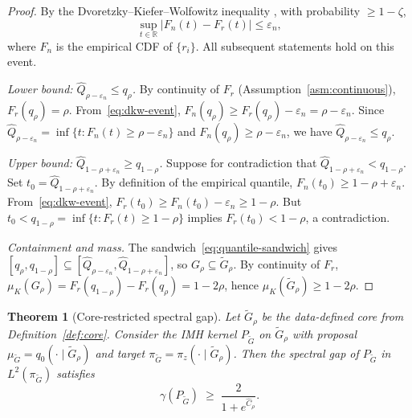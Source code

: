 \documentclass[12pt]{article}
\newtheorem{theorem}{Theorem}
\newcommand{\R}{\mathbb{R}}
\begin{document}
\begin{proof}
By the Dvoretzky--Kiefer--Wolfowitz inequality \citep{DKW1956,Massart1990}, with probability $\ge 1 - \zeta$,
\begin{equation}\label{eq:dkw-event}
  \sup_{t \in \R} |F_n(t) - F_r(t)| \le \varepsilon_n,
\end{equation}
where $F_n$ is the empirical CDF of $\{r_i\}$. All subsequent statements hold on this event.

\emph{Lower bound: $\hat{Q}_{\rho-\varepsilon_n} \le q_\rho$.}\;
By continuity of $F_r$ (Assumption~\ref{asm:continuous}), $F_r(q_\rho) = \rho$.
From~\eqref{eq:dkw-event}, $F_n(q_\rho) \ge F_r(q_\rho) - \varepsilon_n = \rho - \varepsilon_n$.
Since $\hat{Q}_{\rho-\varepsilon_n} = \inf\{t: F_n(t) \ge \rho - \varepsilon_n\}$ and $F_n(q_\rho) \ge \rho - \varepsilon_n$,
we have $\hat{Q}_{\rho-\varepsilon_n} \le q_\rho$.

\emph{Upper bound: $\hat{Q}_{1-\rho+\varepsilon_n} \ge q_{1-\rho}$.}\;
Suppose for contradiction that $\hat{Q}_{1-\rho+\varepsilon_n} < q_{1-\rho}$.
Set $t_0 = \hat{Q}_{1-\rho+\varepsilon_n}$.
By definition of the empirical quantile, $F_n(t_0) \ge 1-\rho+\varepsilon_n$.
From~\eqref{eq:dkw-event}, $F_r(t_0) \ge F_n(t_0) - \varepsilon_n \ge 1-\rho$.
But $t_0 < q_{1-\rho} = \inf\{t: F_r(t) \ge 1-\rho\}$ implies $F_r(t_0) < 1-\rho$, a contradiction.

\emph{Containment and mass.}\;
The sandwich~\eqref{eq:quantile-sandwich} gives $[q_\rho, q_{1-\rho}] \subseteq [\hat{Q}_{\rho-\varepsilon_n}, \hat{Q}_{1-\rho+\varepsilon_n}]$,
so $G_\rho \subseteq \tilde{G}_\rho$.
By continuity of $F_r$, $\mu_K(G_\rho) = F_r(q_{1-\rho}) - F_r(q_\rho) = 1 - 2\rho$, hence $\mu_K(\tilde{G}_\rho) \ge 1-2\rho$.
\end{proof}


\begin{theorem}[Core-restricted spectral gap]\label{thm:core-gap}
Let $\tilde{G}_\rho$ be the data-defined core from Definition~\ref{def:core}.
Consider the IMH kernel $P_{\tilde{G}}$ on $\tilde{G}_\rho$ with proposal $\mu_{\tilde{G}} = q_0(\cdot \mid \tilde{G}_\rho)$ and target $\pi_{\tilde{G}} = \pi_z(\cdot \mid \tilde{G}_\rho)$.
Then the spectral gap of $P_{\tilde{G}}$ in $L^2(\pi_{\tilde{G}})$ satisfies
\begin{equation}\label{eq:core-gap}
  \gamma(P_{\tilde{G}}) \;\ge\; \frac{2}{1 + e^{\hat{C}_\rho}}.
\end{equation}
\end{theorem}
\end{document}
